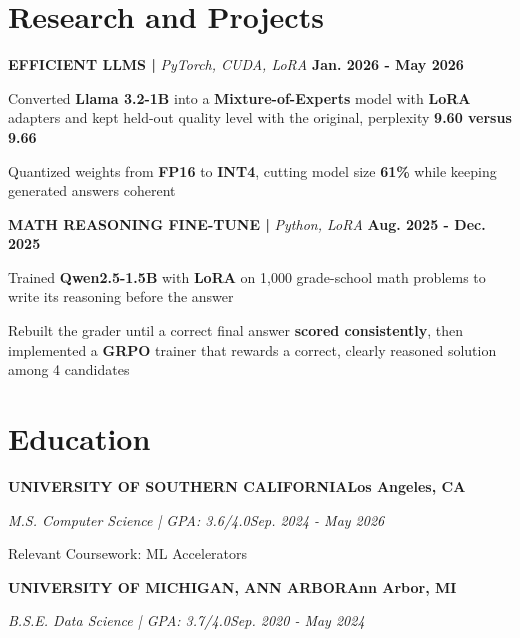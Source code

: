 \documentclass[10pt]{article}
\renewcommand{\note}[1]{#1\par}
\newcommand{\school}[4]{%
  \vspace{2pt}%
  \textbf{\MakeUppercase{#1}}\hfill\textbf{#2}\par
  \vspace{0.5pt}%
  \textit{#3}\hfill\textit{#4}\par
}
\newcommand{\proj}[4]{%
  \vspace{3pt}%
  \textbf{\MakeUppercase{#1} | }\textit{#2}\hfill
  \textbf{#4}%
  \notblank{#3}{\ \textbf{| #3}}{}%
  \par
}
\begin{document}
\section{Research and Projects}
\vspace{-3pt}
\proj{Efficient LLMs}{PyTorch, CUDA, LoRA}{USC}{Jan. 2026 - May 2026}
\begin{bullets}
  \item Converted \textbf{Llama 3.2-1B} into a \textbf{Mixture-of-Experts} model with \textbf{LoRA} adapters and kept held-out quality level with the original, perplexity \textbf{9.60 versus 9.66}
  \item Quantized weights from \textbf{FP16} to \textbf{INT4}, cutting model size \textbf{61\%} while keeping generated answers coherent
\end{bullets}

\proj{Math Reasoning Fine-Tune}{Python, LoRA}{USC}{Aug. 2025 - Dec. 2025}
\begin{bullets}
  \item Trained \textbf{Qwen2.5-1.5B} with \textbf{LoRA} on 1,000 grade-school math problems to write its reasoning before the answer
  \item Rebuilt the grader until a correct final answer \textbf{scored consistently}, then implemented a \textbf{GRPO} trainer that rewards a correct, clearly reasoned solution among 4 candidates
\end{bullets}

\section{Education}
\vspace{-2pt}
\school{University of Southern California}{Los Angeles, CA}{M.S. Computer Science | GPA: 3.6/4.0}{Sep. 2024 - May 2026}
\note{Relevant Coursework: ML Accelerators}

\school{University of Michigan, Ann Arbor}{Ann Arbor, MI}{B.S.E. Data Science | GPA: 3.7/4.0}{Sep. 2020 - May 2024}
\end{document}
